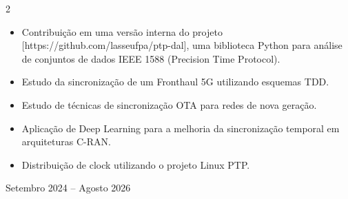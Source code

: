 \documentclass[10pt,a4paper,ragged2e,withhyper]{altacv}
\begin{document}
\begin{paracol}{2}
\begin{itemize}
\item Contribuição em uma versão interna do projeto 
[https://github.com/lasseufpa/ptp-dal], uma biblioteca Python para análise de conjuntos de dados IEEE 1588 (Precision Time Protocol).
\item Estudo da sincronização de um Fronthaul 5G utilizando esquemas TDD.
\end{itemize}







\begin{itemize}
  \item Estudo de técnicas de sincronização OTA para redes de nova geração.
  \item Aplicação de Deep Learning para a melhoria da sincronização temporal em arquiteturas C-RAN.
  \item Distribuição de clock utilizando o projeto Linux PTP.
\end{itemize}

\switchcolumn

{Setembro 2024 -- Agosto 2026}{}


\end{paracol}
\end{document}
